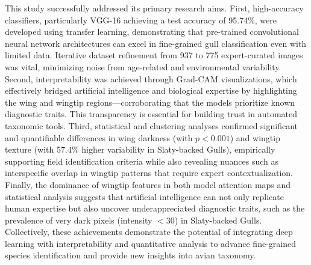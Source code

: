 \documentclass[a4paper,12pt]{report}
\begin{document}
This study successfully addressed its primary research aims. First, high-accuracy classifiers, particularly VGG-16 achieving a test accuracy of 95.74\%, were developed using transfer learning, demonstrating that pre-trained convolutional neural network architectures can excel in fine-grained gull classification even with limited data. Iterative dataset refinement from 937 to 775 expert-curated images was vital, minimizing noise from age-related and environmental variability. Second, interpretability was achieved through Grad-CAM visualizations, which effectively bridged artificial intelligence and biological expertise by highlighting the wing and wingtip regions---corroborating that the models prioritize known diagnostic traits. This transparency is essential for building trust in automated taxonomic tools. Third, statistical and clustering analyses confirmed significant and quantifiable differences in wing darkness (with $p < 0.001$) and wingtip texture (with 57.4\% higher variability in Slaty-backed Gulls), empirically supporting field identification criteria while also revealing nuances such as interspecific overlap in wingtip patterns that require expert contextualization. Finally, the dominance of wingtip features in both model attention maps and statistical analysis suggests that artificial intelligence can not only replicate human expertise but also uncover underappreciated diagnostic traits, such as the prevalence of very dark pixels (intensity $<$30) in Slaty-backed Gulls. Collectively, these achievements demonstrate the potential of integrating deep learning with interpretability and quantitative analysis to advance fine-grained species identification and provide new insights into avian taxonomy.




\end{document}
